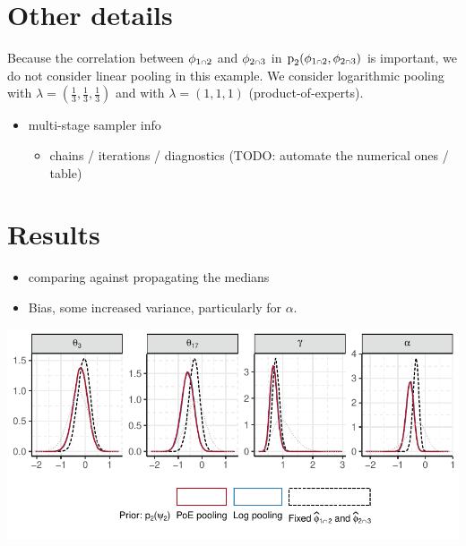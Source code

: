 \documentclass[
  10pt,
  a4paper,
]{article}
\providecommand{\tightlist}{%
  \setlength{\itemsep}{0pt}\setlength{\parskip}{0pt}}
\let\Oldcap\cap
\renewcommand{\cap}{\mathrel{\mathsmaller{\Oldcap}}}
\newcommand{\pd}{\text{p}}
\begin{document}
\hypertarget{other-details}{%
\section{Other details}\label{other-details}}

Because the correlation between \(\phi_{1 \cap 2}\) and
\(\phi_{2 \cap 3}\) in \(\pd_{2}(\phi_{1 \cap 2}, \phi_{2 \cap 3})\) is
important, we do not consider linear pooling in this example. We
consider logarithmic pooling with
\(\lambda = (\frac{1}{3}, \frac{1}{3}, \frac{1}{3})\) and with
\(\lambda = (1, 1, 1)\) (product-of-experts).

\begin{itemize}
\tightlist
\item
  multi-stage sampler info

  \begin{itemize}
  \tightlist
  \item
    chains / iterations / diagnostics (TODO: automate the numerical ones
    / table)
  \end{itemize}
\end{itemize}

\hypertarget{results}{%
\section{Results}\label{results}}

\begin{itemize}
\tightlist
\item
  comparing against propagating the medians
\item
  Bias, some increased variance, particularly for \(\alpha\).
\end{itemize}

\begin{center}\includegraphics{../plots/mimic-example/psi-2-method-comparison-small} \end{center}
\end{document}

